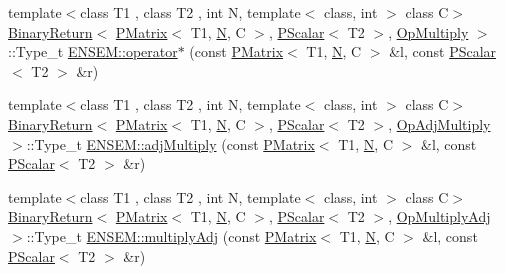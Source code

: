 \begin{DoxyCompactItemize}
\item 
{\footnotesize template$<$class T1 , class T2 , int N, template$<$ class, int $>$ class C$>$ }\\\mbox{\hyperlink{structENSEM_1_1BinaryReturn}{Binary\+Return}}$<$ \mbox{\hyperlink{classENSEM_1_1PMatrix}{P\+Matrix}}$<$ T1, \mbox{\hyperlink{adat__devel_2lib_2hadron_2operator__name__util_8cc_a7722c8ecbb62d99aee7ce68b1752f337}{N}}, C $>$, \mbox{\hyperlink{classENSEM_1_1PScalar}{P\+Scalar}}$<$ T2 $>$, \mbox{\hyperlink{structENSEM_1_1OpMultiply}{Op\+Multiply}} $>$\+::Type\+\_\+t \mbox{\hyperlink{group__primmatrix_ga9edd8305793268c1fbc1b874baa000d3}{E\+N\+S\+E\+M\+::operator$\ast$}} (const \mbox{\hyperlink{classENSEM_1_1PMatrix}{P\+Matrix}}$<$ T1, \mbox{\hyperlink{adat__devel_2lib_2hadron_2operator__name__util_8cc_a7722c8ecbb62d99aee7ce68b1752f337}{N}}, C $>$ \&l, const \mbox{\hyperlink{classENSEM_1_1PScalar}{P\+Scalar}}$<$ T2 $>$ \&r)
\item 
{\footnotesize template$<$class T1 , class T2 , int N, template$<$ class, int $>$ class C$>$ }\\\mbox{\hyperlink{structENSEM_1_1BinaryReturn}{Binary\+Return}}$<$ \mbox{\hyperlink{classENSEM_1_1PMatrix}{P\+Matrix}}$<$ T1, \mbox{\hyperlink{adat__devel_2lib_2hadron_2operator__name__util_8cc_a7722c8ecbb62d99aee7ce68b1752f337}{N}}, C $>$, \mbox{\hyperlink{classENSEM_1_1PScalar}{P\+Scalar}}$<$ T2 $>$, \mbox{\hyperlink{structENSEM_1_1OpAdjMultiply}{Op\+Adj\+Multiply}} $>$\+::Type\+\_\+t \mbox{\hyperlink{group__primmatrix_ga47a69844104af73a48b189fb08811b87}{E\+N\+S\+E\+M\+::adj\+Multiply}} (const \mbox{\hyperlink{classENSEM_1_1PMatrix}{P\+Matrix}}$<$ T1, \mbox{\hyperlink{adat__devel_2lib_2hadron_2operator__name__util_8cc_a7722c8ecbb62d99aee7ce68b1752f337}{N}}, C $>$ \&l, const \mbox{\hyperlink{classENSEM_1_1PScalar}{P\+Scalar}}$<$ T2 $>$ \&r)
\item 
{\footnotesize template$<$class T1 , class T2 , int N, template$<$ class, int $>$ class C$>$ }\\\mbox{\hyperlink{structENSEM_1_1BinaryReturn}{Binary\+Return}}$<$ \mbox{\hyperlink{classENSEM_1_1PMatrix}{P\+Matrix}}$<$ T1, \mbox{\hyperlink{adat__devel_2lib_2hadron_2operator__name__util_8cc_a7722c8ecbb62d99aee7ce68b1752f337}{N}}, C $>$, \mbox{\hyperlink{classENSEM_1_1PScalar}{P\+Scalar}}$<$ T2 $>$, \mbox{\hyperlink{structENSEM_1_1OpMultiplyAdj}{Op\+Multiply\+Adj}} $>$\+::Type\+\_\+t \mbox{\hyperlink{group__primmatrix_ga1635949cdf21523d1c8bdb6d5ada65a8}{E\+N\+S\+E\+M\+::multiply\+Adj}} (const \mbox{\hyperlink{classENSEM_1_1PMatrix}{P\+Matrix}}$<$ T1, \mbox{\hyperlink{adat__devel_2lib_2hadron_2operator__name__util_8cc_a7722c8ecbb62d99aee7ce68b1752f337}{N}}, C $>$ \&l, const \mbox{\hyperlink{classENSEM_1_1PScalar}{P\+Scalar}}$<$ T2 $>$ \&r)

\end{DoxyCompactItemize}
